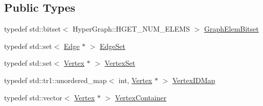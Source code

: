 \subsection*{Public Types}
\begin{DoxyCompactItemize}
\item 
typedef std\+::bitset$<$ Hyper\+Graph\+::\+H\+G\+E\+T\+\_\+\+N\+U\+M\+\_\+\+E\+L\+E\+MS $>$ \mbox{\hyperlink{classg2o_1_1_hyper_graph_a7b8fda20e1b03e92aeceeac6e8218b73}{Graph\+Elem\+Bitset}}
\item 
typedef std\+::set$<$ \mbox{\hyperlink{classg2o_1_1_hyper_graph_1_1_edge}{Edge}} $\ast$ $>$ \mbox{\hyperlink{classg2o_1_1_hyper_graph_a5e2970e236c0dcb4eff7c205d7b6b4ae}{Edge\+Set}}
\item 
typedef std\+::set$<$ \mbox{\hyperlink{classg2o_1_1_hyper_graph_1_1_vertex}{Vertex}} $\ast$ $>$ \mbox{\hyperlink{classg2o_1_1_hyper_graph_a703938cdb4bb636860eed55a2489d70c}{Vertex\+Set}}
\item 
typedef std\+::tr1\+::unordered\+\_\+map$<$ int, \mbox{\hyperlink{classg2o_1_1_hyper_graph_1_1_vertex}{Vertex}} $\ast$ $>$ \mbox{\hyperlink{classg2o_1_1_hyper_graph_a97307eac064ebf4b3e2cfbf0718035b5}{Vertex\+I\+D\+Map}}
\item 
typedef std\+::vector$<$ \mbox{\hyperlink{classg2o_1_1_hyper_graph_1_1_vertex}{Vertex}} $\ast$ $>$ \mbox{\hyperlink{classg2o_1_1_hyper_graph_a9339534c99300a0ddac87ba976ef188c}{Vertex\+Container}}
\end{DoxyCompactItemize}
